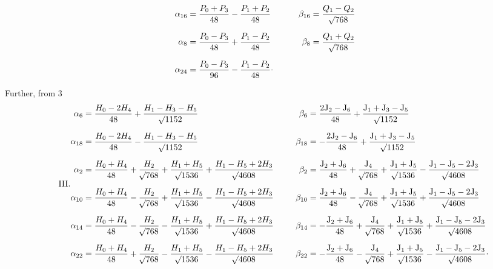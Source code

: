 \begin{landscape}
\[\begin{aligned}
\alpha_{16}&=\frac{P_0+P_3}{48}-\frac{P_1+P_2}{48}&\qquad\beta_{16}&=\frac{Q_1-Q_2}{\BareRoot{768}}\\[6pt]
\alpha_8&=\frac{P_0-P_3}{48}+\frac{P_1-P_2}{48}&\beta_8&=\frac{Q_1+Q_2}{\BareRoot{768}}\\[6pt]
\alpha_{24}&=\frac{P_0-P_3}{96}-\frac{P_1-P_2}{48}\VthreeRaisedPoint&&
\end{aligned}
\]
\par\noindent\hspace*{\parindent}Further, from 3
\[
\tag*{III.}
\begin{aligned}
\alpha_6&=\frac{H_0-2H_4}{48}+\frac{H_1-H_3-H_5}{\BareRoot{1152}}&\qquad\beta_6&=\frac{2\mathrm{J}_2-\mathrm{J}_6}{48}+\frac{\mathrm{J}_1+\mathrm{J}_3-\mathrm{J}_5}{\BareRoot{1152}}\\[6pt]
\alpha_{18}&=\frac{H_0-2H_4}{48}-\frac{H_1-H_3-H_5}{\BareRoot{1152}}&\beta_{18}&=-\frac{2\mathrm{J}_2-\mathrm{J}_6}{48}+\frac{\mathrm{J}_1+\mathrm{J}_3-\mathrm{J}_5}{\BareRoot{1152}}\\[6pt]
\alpha_2&=\frac{H_0+H_4}{48}+\frac{H_2}{\BareRoot{768}}+\frac{H_1+H_5}{\BareRoot{1536}}+\frac{H_1-H_5+2H_3}{\BareRoot{4608}}&\beta_2&=\frac{\mathrm{J}_2+\mathrm{J}_6}{48}+\frac{\mathrm{J}_4}{\BareRoot{768}}+\frac{\mathrm{J}_1+\mathrm{J}_5}{\BareRoot{1536}}-\frac{\mathrm{J}_1-\mathrm{J}_5-2\mathrm{J}_3}{\BareRoot{4608}}\\[6pt]
\alpha_{10}&=\frac{H_0+H_4}{48}-\frac{H_2}{\BareRoot{768}}+\frac{H_1+H_5}{\BareRoot{1536}}-\frac{H_1-H_5+2H_3}{\BareRoot{4608}}&\beta_{10}&=\frac{\mathrm{J}_2+\mathrm{J}_6}{48}-\frac{\mathrm{J}_4}{\BareRoot{768}}+\frac{\mathrm{J}_1+\mathrm{J}_5}{\BareRoot{1536}}+\frac{\mathrm{J}_1-\mathrm{J}_5-2\mathrm{J}_3}{\BareRoot{4608}}\\[6pt]
\alpha_{14}&=\frac{H_0+H_4}{48}-\frac{H_2}{\BareRoot{768}}-\frac{H_1+H_5}{\BareRoot{1536}}+\frac{H_1-H_5+2H_3}{\BareRoot{4608}}&\beta_{14}&=-\frac{\mathrm{J}_2+\mathrm{J}_6}{48}+\frac{\mathrm{J}_4}{\BareRoot{768}}+\frac{\mathrm{J}_1+\mathrm{J}_5}{\BareRoot{1536}}+\frac{\mathrm{J}_1-\mathrm{J}_5-2\mathrm{J}_3}{\BareRoot{4608}}\\[6pt]
\alpha_{22}&=\frac{H_0+H_4}{48}+\frac{H_2}{\BareRoot{768}}-\frac{H_1+H_5}{\BareRoot{1536}}-\frac{H_1-H_5+2H_3}{\BareRoot{4608}}&\beta_{22}&=-\frac{\mathrm{J}_2+\mathrm{J}_6}{48}-\frac{\mathrm{J}_4}{\BareRoot{768}}+\frac{\mathrm{J}_1+\mathrm{J}_5}{\BareRoot{1536}}-\frac{\mathrm{J}_1-\mathrm{J}_5-2\mathrm{J}_3}{\BareRoot{4608}}\VthreeRaisedPoint
\end{aligned}
\]
\clearpage
\endgroup
\end{landscape}
